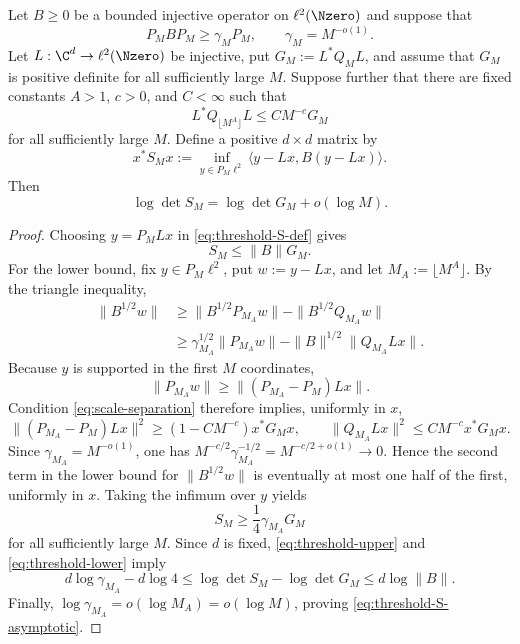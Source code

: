 \begin{lemma}\label{lem:threshold-tail-extraction}
Let $B\ge0$ be a bounded injective operator on $\ell^2(\Nzero)$ and suppose
that
\begin{equation}\label{eq:threshold-B-coercivity}
 P_MB P_M\ge\gamma_M P_M,
 \qquad
 \gamma_M=M^{-o(1)}.
\end{equation}
Let $L:\C^d\to\ell^2(\Nzero)$ be injective, put
$G_M:=L^*Q_ML$, and assume that $G_M$ is positive definite for all sufficiently
large $M$.  Suppose further that there are fixed constants $A>1$, $c>0$, and
$C<\infty$ such that
\begin{equation}\label{eq:scale-separation}
 L^*Q_{\lfloor M^A\rfloor}L
 \le C M^{-c}G_M
\end{equation}
for all sufficiently large $M$.  Define a positive $d\times d$ matrix by
\begin{equation}\label{eq:threshold-S-def}
 x^*S_Mx
 :=\inf_{y\in P_M\ell^2}
 \langle y-Lx,B(y-Lx)\rangle.
\end{equation}
Then
\begin{equation}\label{eq:threshold-S-asymptotic}
 \log\det S_M=\log\det G_M+o(\log M).
\end{equation}
\end{lemma}

\begin{proof}
Choosing $y=P_MLx$ in \eqref{eq:threshold-S-def} gives
\begin{equation}\label{eq:threshold-upper}
 S_M\le\|B\|G_M.
\end{equation}
For the lower bound, fix $y\in P_M\ell^2$, put
$w:=y-Lx$, and let $M_A:=\lfloor M^A\rfloor$.  By the triangle inequality,
\begin{align*}
 \|B^{1/2}w\|
 &\ge \|B^{1/2}P_{M_A}w\|
      -\|B^{1/2}Q_{M_A}w\|\\
 &\ge \gamma_{M_A}^{1/2}\|P_{M_A}w\|
      -\|B\|^{1/2}\|Q_{M_A}Lx\|.
\end{align*}
Because $y$ is supported in the first $M$ coordinates,
\[
 \|P_{M_A}w\|
 \ge\|(P_{M_A}-P_M)Lx\|.
\]
Condition \eqref{eq:scale-separation} therefore implies, uniformly in $x$,
\[
 \|(P_{M_A}-P_M)Lx\|^2
 \ge(1-CM^{-c})x^*G_Mx,
 \qquad
 \|Q_{M_A}Lx\|^2\le CM^{-c}x^*G_Mx.
\]
Since $\gamma_{M_A}=M^{-o(1)}$, one has
$M^{-c/2}\gamma_{M_A}^{-1/2}=M^{-c/2+o(1)}\to0$.  Hence the second term in
the lower bound for $\|B^{1/2}w\|$ is eventually at most one half of the
first, uniformly in $x$.  Taking the infimum over $y$ yields
\begin{equation}\label{eq:threshold-lower}
 S_M\ge\frac14\gamma_{M_A}G_M
\end{equation}
for all sufficiently large $M$.  Since $d$ is fixed,
\eqref{eq:threshold-upper} and \eqref{eq:threshold-lower} imply
\[
 d\log\gamma_{M_A}-d\log4
 \le \log\det S_M-\log\det G_M
 \le d\log\|B\|.
\]
Finally, $\log\gamma_{M_A}=o(\log M_A)=o(\log M)$, proving
\eqref{eq:threshold-S-asymptotic}.
\end{proof}

